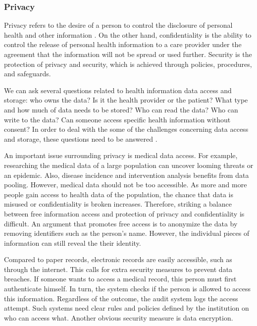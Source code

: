        \subsubsection{Privacy} \label{2_privacy}

        Privacy refers to the desire of a person to control the disclosure of personal health and other information \cite{biomedical_informatics}. On the other hand, confidentiality is the ability to control the release of personal health information to a care provider under the agreement that the information will not be spread or used further. Security is the protection of privacy and security, which is achieved through policies, procedures, and safeguards.

        We can ask several questions related to health information data access and storage: who owns the data? Is it the health provider or the patient? What type and how much of data needs to be stored? Who can read the data? Who can write to the data? Can someone access specific health information without consent? In order to deal with the some of the challenges concerning data access and storage, these questions need to be answered \cite{meingast2006security}.

        An important issue surrounding privacy is medical data access. For example, researching the medical data of a large population can uncover looming threats or an epidemic. Also, disease incidence and intervention analysis benefits from data pooling. However, medical data should not be too accessible. As more and more people gain access to health data of the population, the chance that data is misused or confidentiality is broken increases. Therefore, striking a balance between free information access and protection of privacy and confidentiality is difficult. An argument that promotes free access is to anonymize the data by removing identifiers such as the person's name. However, the individual pieces of information can still reveal the their identity.

        Compared to paper records, electronic records are easily accessible, such as through the internet. This calls for extra security measures to prevent data breaches. If someone wants to access a medical record, this person must first authenticate himself. In turn, the system checks if the person is allowed to access this information. Regardless of the outcome, the audit system logs the access attempt. Such systems need clear rules and policies defined by the institution on who can access what. Another obvious security measure is data encryption.

